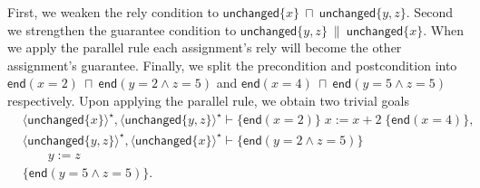 \documentclass{llncs}
\newcommand{\edn}{\mathsf{end}}
\newcommand{\unchanged}{\mathsf{unchanged}}
\begin{document}
First, we weaken the rely condition to $\unchanged\{x\}\ \sqcap\ \unchanged\{y,z\}$. Second we strengthen the guarantee condition to
$\unchanged\{y,z\}\ \|\ \unchanged\{x\}$. When we apply the parallel
rule each assignment's rely will become the other assignment's
guarantee. Finally, we split the precondition and postcondition into
$\edn(x = 2)\ \sqcap\ \edn(y = 2 \land z = 5)$ and $\edn(x =
4)\ \sqcap\ \edn(y = 5 \land z = 5)$ respectively. Upon applying the
parallel rule, we obtain two trivial goals
\begin{align*}
&\langle\unchanged\{x\}\rangle^\star, \langle\unchanged\{y,z\}\rangle^\star \vdash \{\edn(x = 2)\}\;x := x + 2 \;\{\edn (x = 4)\},\\
&\langle\unchanged\{y,z\}\rangle^\star, \langle\unchanged\{x\}\rangle^\star \vdash \{\edn(y = 2 \land z = 5)\}\\
&\qquad y := z \\
&\{\edn (y = 5 \land z = 5)\}.
\end{align*}
\end{document}
